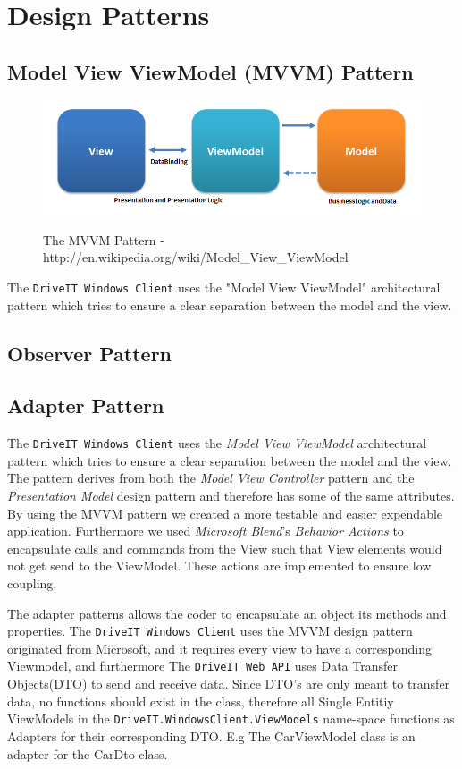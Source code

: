 \section{Design Patterns}
\subsection{Model View ViewModel (MVVM) Pattern}
\begin{figure}[H]
	\centering
	\includegraphics[scale=0.6]{Figures/WebImages/MVVMPattern}\\
	\caption{The MVVM Pattern - http://en.wikipedia.org/wiki/Model\_View\_ViewModel}
	\label{fig:MVVMPattern}
\end{figure}
The \texttt{DriveIT Windows Client} uses the "Model View ViewModel" architectural pattern which tries to ensure a clear separation between the model and the view. 
\subsection{Observer Pattern}

\subsection{Adapter Pattern}
The \texttt{DriveIT Windows Client} uses the \emph{Model View ViewModel} architectural pattern which tries to ensure a clear separation between the model and the view. The pattern derives from both the \emph{Model View Controller} pattern and the \emph{Presentation Model} design pattern and therefore has some of the same attributes. By using the MVVM pattern we created a more testable and easier expendable application. Furthermore we used \emph{Microsoft Blend}'s \emph{Behavior Actions} to encapsulate calls and commands from the View such that View elements would not get send to the ViewModel. These actions are implemented to ensure low coupling.

The adapter patterns allows the coder to encapsulate an object its methods and properties. The \texttt{DriveIT Windows Client} uses the MVVM design pattern originated from Microsoft, and it requires every view to have a corresponding Viewmodel, and furthermore The \texttt{DriveIT Web API} uses Data Transfer Objects(DTO) to send and receive data. Since DTO's are only meant to transfer data, no functions should exist in the class, therefore all Single Entitiy ViewModels in the \texttt{DriveIT.WindowsClient.ViewModels} name-space functions as Adapters for their corresponding DTO. E.g The CarViewModel class is an adapter for the CarDto class.\\ 

